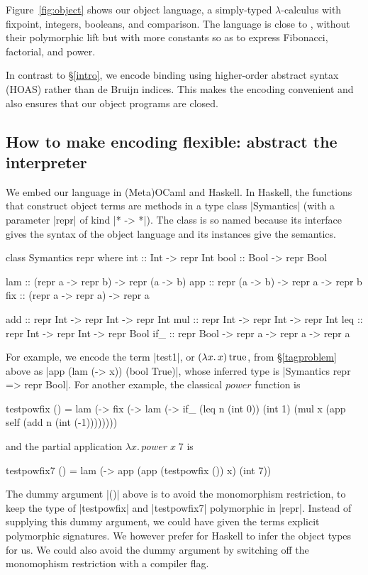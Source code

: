 \documentclass[preprint]{sigplanconf}
\newcommand{\fun}[1]{\mathopen{\lambda\mathord{#1}.\,}}
\newcommand{\True}{\mathinner{\mathrm{true}}}
\begin{document}
Figure~\ref{fig:object} shows our object language, a simply-typed
$\lambda$-calculus with fixpoint, integers, booleans, and comparison.
The language is close to , without their polymorphic
lift but with more constants so as to express Fibonacci, factorial, and
power.

In contrast to \S\ref{intro}, we encode binding using higher-order
abstract syntax (HOAS) \citep{miller-manipulating,pfenning-higher-order}
rather than de Bruijn indices. This makes the encoding convenient and
also ensures that our object programs are closed.

\subsection{How to make encoding flexible: abstract the interpreter}
\label{encoding}

We embed our language in (Meta)OCaml and Haskell.  In Haskell,
the functions that construct object terms are methods in a type class
|Symantics| (with a parameter |repr| of kind |* -> *|). The class is so named
because its interface gives the syntax of the object language and its
instances give the semantics.
\begin{code}
class Symantics repr where
  int  :: Int  -> repr Int
  bool :: Bool -> repr Bool

  lam :: (repr a -> repr b) -> repr (a -> b)
  app :: repr (a -> b) -> repr a -> repr b
  fix :: (repr a -> repr a) -> repr a

  add :: repr Int -> repr Int -> repr Int
  mul :: repr Int -> repr Int -> repr Int
  leq :: repr Int -> repr Int -> repr Bool
  if_ :: repr Bool -> repr a -> repr a -> repr a
\end{code}
For example, we encode the term |test1|, or $(\fun{x}x)\True$, from
\S\ref{tagproblem} above as |app (lam (\x -> x)) (bool True)|,
whose inferred type is |Symantics repr => repr Bool|.
For another example, the classical $\mathit{power}$ function is
\begin{code}
testpowfix () = 
  lam (\x -> fix (\self -> lam (\n ->
  if_ (leq n (int 0)) (int 1)
      (mul x (app self (add n (int (-1))))))))
\end{code}
and the partial application $\fun{x} \mathit{power}\;x\;7$ is
\begin{code}
testpowfix7 () = 
 lam (\x -> app (app (testpowfix ()) x) (int 7))
\end{code}
The dummy argument |()| above is to avoid the monomorphism
restriction, to keep the type of |testpowfix| and |testpowfix7|
polymorphic in |repr|. Instead of supplying this dummy
argument, we could have given the terms explicit polymorphic
signatures.  We however prefer for
Haskell to infer the object types for us. We could also
avoid the dummy argument by switching off the monomophism restriction
with a compiler flag.
\end{document}
